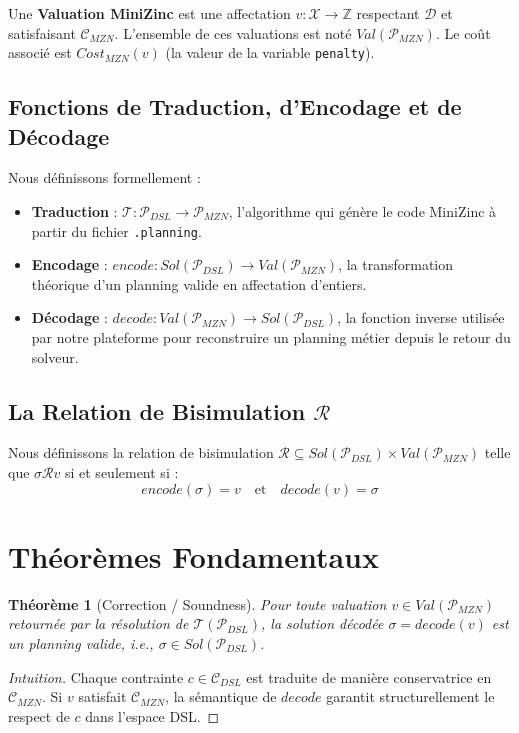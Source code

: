 \documentclass[12pt,a4paper]{article}
\newtheorem{theorem}{Théorème}[section]
\begin{document}
Une \textbf{Valuation MiniZinc} est une affectation $v : \mathcal{X} \to \mathbb{Z}$ respectant $\mathcal{D}$ et satisfaisant $\mathcal{C}_{MZN}$. L'ensemble de ces valuations est noté $Val(\mathcal{P}_{MZN})$. Le coût associé est $Cost_{MZN}(v)$ (la valeur de la variable \texttt{penalty}).

\subsection{Fonctions de Traduction, d'Encodage et de Décodage}
Nous définissons formellement :
\begin{itemize}
    \item \textbf{Traduction} : $\mathcal{T} : \mathcal{P}_{DSL} \longrightarrow \mathcal{P}_{MZN}$, l'algorithme qui génère le code MiniZinc à partir du fichier \texttt{.planning}.
    \item \textbf{Encodage} : $encode : Sol(\mathcal{P}_{DSL}) \longrightarrow Val(\mathcal{P}_{MZN})$, la transformation théorique d'un planning valide en affectation d'entiers.
    \item \textbf{Décodage} : $decode : Val(\mathcal{P}_{MZN}) \longrightarrow Sol(\mathcal{P}_{DSL})$, la fonction inverse utilisée par notre plateforme pour reconstruire un planning métier depuis le retour du solveur.
\end{itemize}

\subsection{La Relation de Bisimulation $\mathcal{R}$}
Nous définissons la relation de bisimulation $\mathcal{R} \subseteq Sol(\mathcal{P}_{DSL}) \times Val(\mathcal{P}_{MZN})$ telle que $\sigma \mathcal{R} v$ si et seulement si :
\[ encode(\sigma) = v \quad \text{et} \quad decode(v) = \sigma \]

\section{Théorèmes Fondamentaux}

\begin{theorem}[Correction / Soundness]
Pour toute valuation $v \in Val(\mathcal{P}_{MZN})$ retournée par la résolution de $\mathcal{T}(\mathcal{P}_{DSL})$, la solution décodée $\sigma = decode(v)$ est un planning valide, i.e., $\sigma \in Sol(\mathcal{P}_{DSL})$.
\end{theorem}
\begin{proof}[Intuition]
Chaque contrainte $c \in \mathcal{C}_{DSL}$ est traduite de manière conservatrice en $\mathcal{C}_{MZN}$. Si $v$ satisfait $\mathcal{C}_{MZN}$, la sémantique de $decode$ garantit structurellement le respect de $c$ dans l'espace DSL.
\end{proof}
\end{document}
